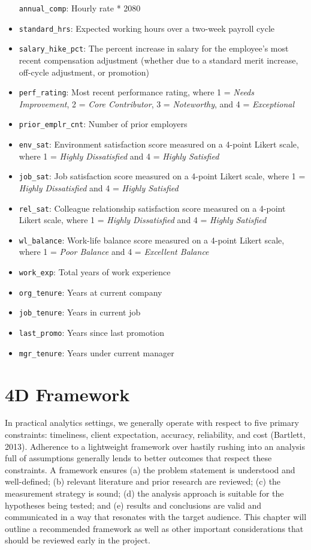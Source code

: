 \documentclass[]{book}
\begin{document}
\begin{itemize}
  \texttt{annual\_comp}: Hourly rate * 2080
\item
  \texttt{standard\_hrs}: Expected working hours over a two-week payroll cycle
\item
  \texttt{salary\_hike\_pct}: The percent increase in salary for the employee's most recent compensation adjustment (whether due to a standard merit increase, off-cycle adjustment, or promotion)
\item
  \texttt{perf\_rating}: Most recent performance rating, where 1 = \emph{Needs Improvement}, 2 = \emph{Core Contributor}, 3 = \emph{Noteworthy}, and 4 = \emph{Exceptional}
\item
  \texttt{prior\_emplr\_cnt}: Number of prior employers
\item
  \texttt{env\_sat}: Environment satisfaction score measured on a 4-point Likert scale, where 1 = \emph{Highly Dissatisfied} and 4 = \emph{Highly Satisfied}
\item
  \texttt{job\_sat}: Job satisfaction score measured on a 4-point Likert scale, where 1 = \emph{Highly Dissatisfied} and 4 = \emph{Highly Satisfied}
\item
  \texttt{rel\_sat}: Colleague relationship satisfaction score measured on a 4-point Likert scale, where 1 = \emph{Highly Dissatisfied} and 4 = \emph{Highly Satisfied}
\item
  \texttt{wl\_balance}: Work-life balance score measured on a 4-point Likert scale, where 1 = \emph{Poor Balance} and 4 = \emph{Excellent Balance}
\item
  \texttt{work\_exp}: Total years of work experience
\item
  \texttt{org\_tenure}: Years at current company
\item
  \texttt{job\_tenure}: Years in current job
\item
  \texttt{last\_promo}: Years since last promotion
\item
  \texttt{mgr\_tenure}: Years under current manager
\end{itemize}

\hypertarget{d-framework}{%
\section{4D Framework}\label{d-framework}}

In practical analytics settings, we generally operate with respect to five primary constraints: timeliness, client expectation, accuracy, reliability, and cost (Bartlett, 2013). Adherence to a lightweight framework over hastily rushing into an analysis full of assumptions generally lends to better outcomes that respect these constraints. A framework ensures (a) the problem statement is understood and well-defined; (b) relevant literature and prior research are reviewed; (c) the measurement strategy is sound; (d) the analysis approach is suitable for the hypotheses being tested; and (e) results and conclusions are valid and communicated in a way that resonates with the target audience. This chapter will outline a recommended framework as well as other important considerations that should be reviewed early in the project.
\end{document}
